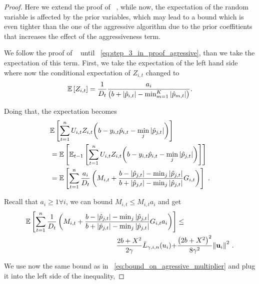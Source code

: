 {\begin{proof}
Here we extend the proof of   ~, while now, 
the expectation of the random variable is affected by the prior variables, which may  lead to a bound which is 
even tighter than the one of the aggressive algorithm due to the prior coeffitients that increases the 
effect of the aggressiveness term.  

We follow the proof of ~ until ~\eqref{eq:step_3_in_proof_agressive}, 
than we take the expectation of this term. First, we take the expectation of the left hand side 
where now the conditional expectation of $Z_{i,t}$ changed to 
\[
\mathbb{E}\left[{Z_{i,t}}\right]=\frac{1}{D_{t}}\frac{a_{i}}{\left({b+\left\vert{\hat{p}_{i,t}}\right\vert-\min_{m=1}^K\left\vert{\hat{p}_{m,t}}\right\vert}\right)}.
\]

\noindent
Doing that, the expectation becomes
\begin{align*}
\begin{split}
&\mathbb{E}\left[{\sum_{t=1}^{n}U_{i,t}Z_{i,t}{\left({b-y_{i,t}\hat{p}_{i,t}-\min_{j}{\left\vert{ \hat{p}_{j,t}}\right\vert}}\right)}}\right] \\
        &=\mathbb{E}\left[{\mathbb{E}_{t-1}\left[{{\sum_{t=1}^{n}{U_{i,t}Z_{i,t}{\left(b-y_{i,t}\hat{p}_{i,t}-\min_{j}{\left\vert{\hat{p}_{j,t}}\right\vert}\right)}}}}\right]}\right] \\
&=\mathbb{E}\left[{\sum_{t=1}^{n}{\frac{a_{i}}{D_{t}}\left({M_{i,t}+\frac{b-\left\vert{\hat{p}_{j,t}}\right\vert-\min_{j}{\left\vert{\hat{p}_{j,t}}\right\vert }}{b+\left\vert{\hat{p}_{j,t}}\right\vert-\min_{j}{\left\vert{\hat{p}_{j,t}}\right\vert}}G_{i,t} }\right)}}\right]~.
\end{split}
\end{align*}

\noindent
Recall that $a_{i} \ge 1 \forall i$, we can bound $M_{i,t} \le M_{i,t}a_{i}$ and get 
\begin{equation}
\begin{split}
\mathbb{E}\left[ \sum_{t=1}^{n}{\frac{1}{D_{t}}}\left({M_{i,t}+\frac{b-\left\vert{\hat{p}_{j,t}}\right\vert-\min_{j}{\left\vert{\hat{p}_{j,t}}\right\vert }}{b+\left\vert{\hat{p}_{j,t}}\right\vert-\min_{j}{\left\vert{\hat{p}_{j,t}}\right\vert}}G_{i,t}a_{i} }\right) \right]
&\le \\ \frac{2b+X^2}{2\gamma}{\bar
  L}_{\gamma,i,n}(u_i)+&\frac{\left({2b+X^2}\right)^2}{8{\gamma}^2}{\left\Vert
    \mathbf{u}_{i} \right\Vert}^2~.
\label{eq:step_3_in_proof_prior}
\end{split}
\end{equation}

\noindent
We use now the same bound as in ~\eqref{eq:bound_on_agressive_multiplier}
and plug it into the left side of the inequality,


\end{proof}}
